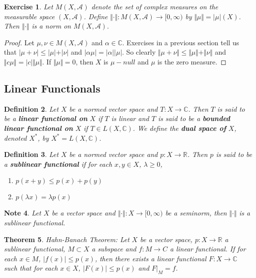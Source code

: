 \documentclass[12pt]{amsart}
\newtheorem{thm}{Theorem}[section]
\newtheorem{defn}[thm]{Definition}
\newtheorem{note}[thm]{Note}
\newtheorem{ex}[thm]{Exercise}
\newcommand{\al}{\alpha}
\newcommand{\lam}{\lambda}
\newcommand{\C}{\mathbb{C}}
\newcommand{\R}{\mathbb{R}}
\newcommand{\MA}{\mathcal{A}}
\newcommand{\Rg}{[0,\infty)}
\newcommand{\n}{\Vert}
\begin{document}
\begin{ex}
Let $M(X, \MA)$ denote the set of complex measures on the measurable space $(X, \MA)$. Define $\n \cdot \n : M(X, \MA) \rightarrow \Rg$ by $\n \mu \n = \vert \mu \vert (X)$. Then $\n \cdot \n$ is a norm on $M(X, \MA)$. 
\end{ex}

\begin{proof}
Let $\mu, \nu \in M(X, \MA)$ and $\al \in \C$. Exercises in a previous section tell us that $\vert \mu + \nu \vert \leq \vert \mu \vert + \vert \nu \vert$ and $\vert \al \mu \vert = \vert \al \vert \vert \mu \vert$. So clearly $\n \mu + \nu \n \leq \n \mu \n + \n \nu \n$ and $\n c \mu \n = \vert c \vert \n \mu \n $. If $\n \mu \n = 0$, then $X$ is $\mu-null$ and $\mu$ is the zero measure.
\end{proof}

\subsection{Linear Functionals}

\begin{defn}
Let $X$ be a normed vector space and $T :X \rightarrow \C$. Then $T$ is said to be a \textbf{linear functional on} $X$ if $T$ is linear and $T$ is said to be a \textbf{bounded linear functional on} $X$ if $T \in L(X, \C)$. We define the \textbf{dual space of} $X$, denoted $X^*$, by $X^* = L(X, \C)$.
\end{defn}

\begin{defn}
Let $X$ be a normed vector space and $p:X \rightarrow \R$. Then $p$ is said to be a \textbf{sublinear functional} if for each $x,y \in X$, $\lam \geq 0$, 
\begin{enumerate}
\item $p(x+y) \leq p(x) + p(y)$
\item $p(\lam x ) = \lam p(x)$
\end{enumerate}  
\end{defn}

\begin{note}
Let $X$ be a vector space and $\n \cdot \n : X \rightarrow \Rg$ be a seminorm, then $\n \cdot \n$ is a sublinear functional.
\end{note}

\begin{thm}{Hahn-Banach Theorem:}
Let $X$ be a vector space, $p:X \rightarrow \R$ a sublinear functional, $M \subset X$ a subspace and $f:M \rightarrow C$ a linear functional. If for each $x \in M$, $\vert f(x) \vert \leq p(x)$, then there exists a linear functional $F:X \rightarrow \C$ such that for each $x \in X$, $\vert F(x) \vert \leq p(x)$ and $F|_{M}=f$.
\end{thm}
\end{document}
